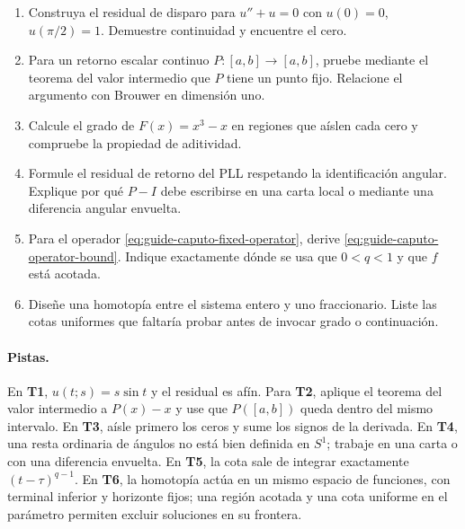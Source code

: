 \begin{enumerate}[label=\textbf{T\arabic*.}]
 \item Construya el residual de disparo para $u''+u=0$ con
 $u(0)=0$, $u(\pi/2)=1$. Demuestre continuidad y encuentre el cero.
 \item Para un retorno escalar continuo $P:[a,b]\to[a,b]$, pruebe mediante el
 teorema del valor intermedio que $P$ tiene un punto fijo. Relacione el
 argumento con Brouwer en dimensión uno.
 \item Calcule el grado de $F(x)=x^3-x$ en regiones que aíslen cada cero y
 compruebe la propiedad de aditividad.
 \item Formule el residual de retorno del PLL respetando la identificación
 angular. Explique por qué $P-I$ debe escribirse en una carta local o mediante
 una diferencia angular envuelta.
 \item Para el operador \cref{eq:guide-caputo-fixed-operator}, derive
 \cref{eq:guide-caputo-operator-bound}. Indique exactamente dónde se usa que
 $0<q<1$ y que $f$ está acotada.
 \item Diseñe una homotopía entre el sistema entero y uno fraccionario. Liste
 las cotas uniformes que faltaría probar antes de invocar grado o continuación.
\end{enumerate}

\paragraph{Pistas.}
En \textbf{T1}, $u(t;s)=s\sin t$ y el residual es afín. Para \textbf{T2},
aplique el teorema del valor intermedio a $P(x)-x$ y use que $P([a,b])$ queda
dentro del mismo intervalo. En \textbf{T3}, aísle primero los ceros y sume los
signos de la derivada. En \textbf{T4}, una resta ordinaria de ángulos no está
bien definida en $S^1$; trabaje en una carta o con una diferencia envuelta. En
\textbf{T5}, la cota sale de integrar exactamente
$(t-\tau)^{q-1}$. En \textbf{T6}, la homotopía actúa en un mismo espacio de funciones, con
terminal inferior y horizonte fijos; una región acotada y una cota uniforme
en el parámetro permiten excluir soluciones en su frontera.
\fi
